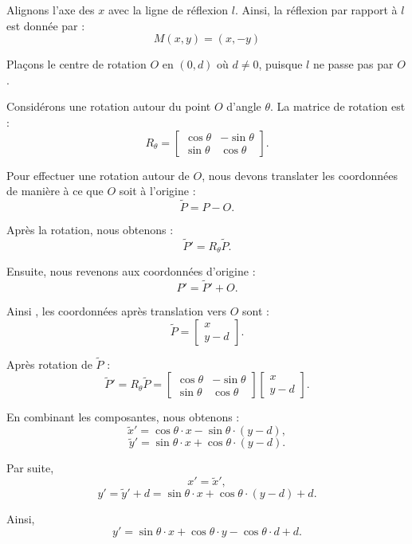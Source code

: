 
Alignons l'axe des $x$ avec la ligne de r{\'e}flexion $l$. Ainsi, la
r{\'e}flexion par rapport {\`a} $l$ est donn{\'e}e par :
\[ M (x, y) = (x, - y) \]


Pla{\c c}ons le centre de rotation $O$ en $(0, d)$ o{\`u} $d \neq 0$, puisque
$l$ ne passe pas par $O$.

Consid{\'e}rons une rotation autour du point $O$ d'angle $\theta$. La matrice
de rotation est :
\[ R_{\theta} = \left[ \begin{array}{cc}
     \cos \theta & - \sin \theta\\
     \sin \theta & \cos \theta
   \end{array} \right] . \]


Pour effectuer une rotation autour de $O$, nous devons translater les
coordonn{\'e}es de mani{\`e}re {\`a} ce que $O$ soit {\`a} l'origine :
\[ \tilde{P} = P - O. \]


Apr{\`e}s la rotation, nous obtenons :
\[ \tilde{P}' = R_{\theta}  \tilde{P} . \]


Ensuite, nous revenons aux coordonn{\'e}es d'origine :
\[ P' = \tilde{P}' + O. \]


Ainsi , les coordonn{\'e}es apr{\`e}s translation vers $O$ sont :
\[ \tilde{P} = \left[ \begin{array}{c}
     x\\
     y - d
   \end{array} \right] . \]


Apr{\`e}s rotation de $\tilde{P}$ :
\[ \tilde{P}' = R_{\theta}  \tilde{P} = \left[ \begin{array}{cc}
     \cos \theta & - \sin \theta\\
     \sin \theta & \cos \theta
   \end{array} \right] \left[ \begin{array}{c}
     x\\
     y - d
   \end{array} \right] . \]


En combinant les composantes, nous obtenons :
\[ \tilde{x}' = \cos \theta \cdot x - \sin \theta \cdot (y - d), \]
\[ \tilde{y}' = \sin \theta \cdot x + \cos \theta \cdot (y - d) . \]


Par suite,
\[ x' = \tilde{x}', \]
\[ y' = \tilde{y}' + d = \sin \theta \cdot x + \cos \theta \cdot (y - d) + d.
\]


Ainsi,
\[ y' = \sin \theta \cdot x + \cos \theta \cdot y - \cos \theta \cdot d + d.
\]


